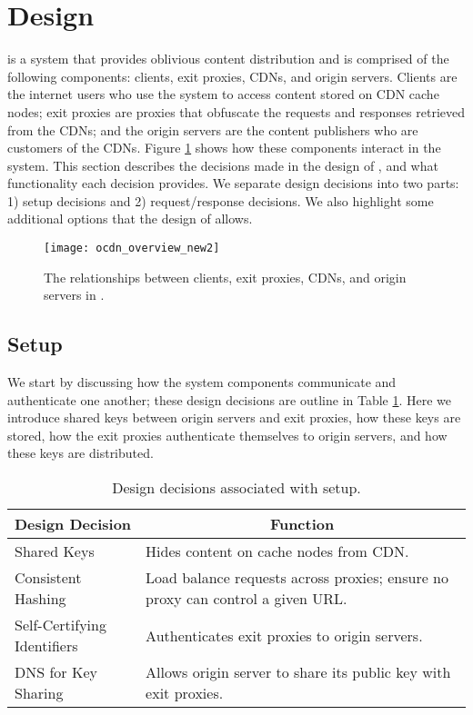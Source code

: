 \section{Design}
\label{sec:design}
\system{} is a system that provides oblivious content distribution and is 
comprised of the following components: clients, exit proxies, CDNs, and origin 
servers.  Clients are the internet users who use the system to access content 
stored on CDN cache nodes; exit proxies are proxies that obfuscate the requests 
and responses retrieved from the CDNs; and the origin servers are the content 
publishers who are customers of the CDNs.  Figure \ref{fig:ocd_overview} shows how
these components interact in the system.  This section describes the decisions 
made in the design of \system{}, and what functionality each decision provides.  
We separate design decisions into two parts: 1) setup decisions and 2) request/response 
decisions.  We also highlight some additional options that the design of 
\system{} allows.

\begin{figure}[t!]
\centering
\texttt{[image: ocdn\_overview\_new2]}
\caption{The relationships between clients, exit proxies, CDNs, and origin servers in 
\system{}.}
\label{fig:ocd_overview}
\end{figure}

\subsection{\system{} Setup}
We start by discussing how the system components communicate and authenticate 
one another; these design decisions are outline in Table \ref{tab:setup}.  Here
we introduce shared keys between origin servers and exit proxies, how these keys are 
stored, how the exit proxies authenticate themselves to origin servers, and how these 
keys are distributed.

\begin{table}[t!]
\footnotesize
\centering
\begin{tabular}{ l  p{2in} } 
 \multicolumn{1}{c}{\bf Design Decision} & \multicolumn{1}{c}{\bf Function} \\
\hline \hline
 Shared Keys & {Hides content on cache nodes from CDN.} \\
 Consistent Hashing & {Load balance requests across proxies; ensure no proxy can
 control a given URL.} \\
 Self-Certifying Identifiers & {Authenticates exit proxies to origin servers.} \\
 DNS for Key Sharing & {Allows origin server to share its public key with exit
 proxies.} \\ \hline
\end{tabular}
\caption{Design decisions associated with \system{} setup.}
\label{tab:setup}
\end{table}

